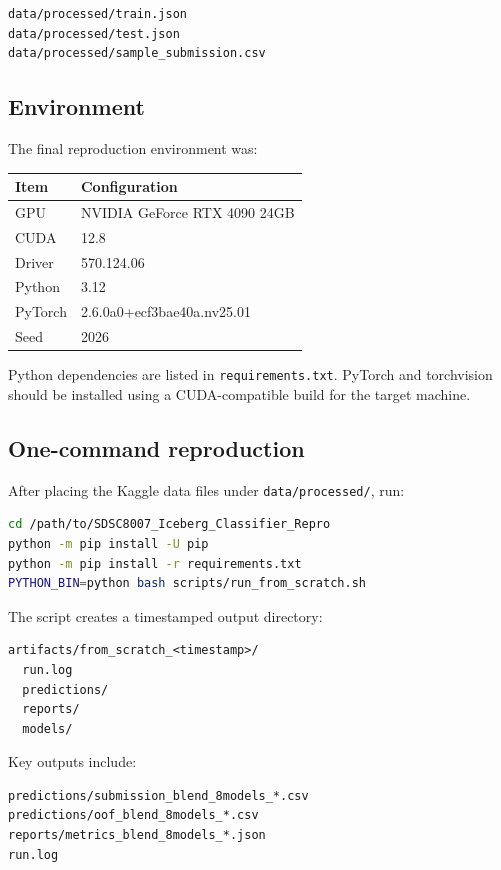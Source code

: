 \documentclass[11pt]{article}
\begin{document}
\begin{lstlisting}
data/processed/train.json
data/processed/test.json
data/processed/sample_submission.csv
\end{lstlisting}

\subsection{Environment}

The final reproduction environment was:

\begin{center}
\begin{tabular}{ll}
\toprule
Item & Configuration \\
\midrule
GPU & NVIDIA GeForce RTX 4090 24GB \\
CUDA & 12.8 \\
Driver & 570.124.06 \\
Python & 3.12 \\
PyTorch & 2.6.0a0+ecf3bae40a.nv25.01 \\
Seed & 2026 \\
\bottomrule
\end{tabular}
\end{center}

Python dependencies are listed in \texttt{requirements.txt}. PyTorch and torchvision should be installed using a CUDA-compatible build for the target machine.

\subsection{One-command reproduction}

After placing the Kaggle data files under \texttt{data/processed/}, run:

\begin{lstlisting}[language=bash]
cd /path/to/SDSC8007_Iceberg_Classifier_Repro
python -m pip install -U pip
python -m pip install -r requirements.txt
PYTHON_BIN=python bash scripts/run_from_scratch.sh
\end{lstlisting}

The script creates a timestamped output directory:

\begin{lstlisting}
artifacts/from_scratch_<timestamp>/
  run.log
  predictions/
  reports/
  models/
\end{lstlisting}

Key outputs include:

\begin{lstlisting}
predictions/submission_blend_8models_*.csv
predictions/oof_blend_8models_*.csv
reports/metrics_blend_8models_*.json
run.log
\end{lstlisting}
\end{document}
